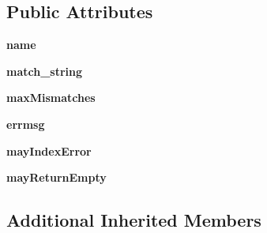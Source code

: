 \subsection*{Public Attributes}
\begin{DoxyCompactItemize}
\item 
\mbox{\label{classpkg__resources_1_1__vendor_1_1pyparsing_1_1_close_match_a398d363d50cc4108563176c9d65a2f0b}} 
{\bfseries name}
\item 
\mbox{\label{classpkg__resources_1_1__vendor_1_1pyparsing_1_1_close_match_acce4c0b39d10c00108a16ab1628ff1aa}} 
{\bfseries match\+\_\+string}
\item 
\mbox{\label{classpkg__resources_1_1__vendor_1_1pyparsing_1_1_close_match_a09058c80659100caec3f519c53d274c6}} 
{\bfseries max\+Mismatches}
\item 
\mbox{\label{classpkg__resources_1_1__vendor_1_1pyparsing_1_1_close_match_abf7e697fcb785e8fa2346981e1405bcf}} 
{\bfseries errmsg}
\item 
\mbox{\label{classpkg__resources_1_1__vendor_1_1pyparsing_1_1_close_match_a642515096d4126c2c59cae20d0db71b1}} 
{\bfseries may\+Index\+Error}
\item 
\mbox{\label{classpkg__resources_1_1__vendor_1_1pyparsing_1_1_close_match_a1e2e94f0db0586ca23f0fac8898b3b69}} 
{\bfseries may\+Return\+Empty}
\end{DoxyCompactItemize}
\subsection*{Additional Inherited Members}


